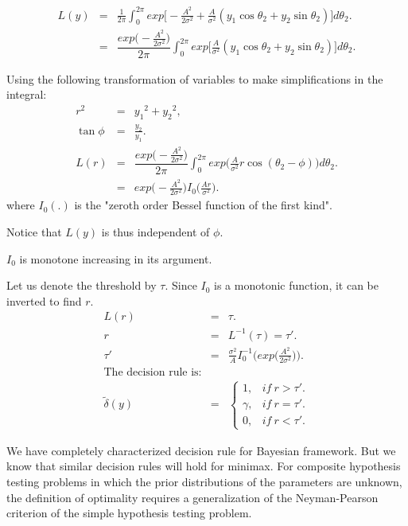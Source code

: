 \documentclass[a4paper,english,12pt]{article}
\begin{document}
\begin{exmp}
\begin{eqnarray}
L(y) &=& \frac{1}{2\pi}\int_{0}^{2\pi}exp\Big[-\frac{A^2}{2{\sigma}^2}+\frac{A}{{\sigma}^2}(y_1\cos\theta_2 + y_2\sin\theta_2)\Big]d\theta_2. \nonumber \\
&=&\dfrac{exp\big(-\frac{A^2}{2{\sigma}^2}\big)}{2\pi}\int_{0}^{2\pi}exp\Big[\frac{A}{{\sigma}^2}(y_1\cos\theta_2 + y_2\sin\theta_2)\Big]d\theta_2.
\end{eqnarray}

Using the following transformation of variables to make simplifications in the integral:
\begin{eqnarray}
r^2 &=& {y_1}^2 + {y_2}^2,\\
\tan\phi &=& \frac{y_2}{y_1}.\\
L(r) &=& \dfrac{exp\big(-\frac{A^2}{2\sigma^2}\big)}{2\pi}\int_{0}^{2\pi}exp\big(\frac{A}{\sigma^2}r\cos(\theta_2 - \phi)\big)d\theta_2.\\
&=& exp\big(-\frac{A^2}{2\sigma^2}\big)I_0\big(\frac{Ar}{\sigma^2}\big).
\end{eqnarray}
where $I_0(.)$ is the "zeroth order Bessel function of the first kind".

\begin{note} 
Notice that $L(y)$ is thus independent of $\phi$.
\end{note}
\begin{note}
$I_0$ is monotone increasing in its argument.
\end{note}

Let us denote the threshold by $\tau$. Since $I_0$ is a monotonic function, it can be inverted to find $r$.
\begin{eqnarray}
L(r) &=& \tau.\\
r &=& L^{-1}(\tau) = \tau'.\\
\tau' &=& \frac{\sigma^2}{A}I_0^{-1}\Big(exp\big(\frac{A^2}{2\sigma^2}\big)\Big).\\
\text{The decision rule is:} \nonumber\\
\tilde{\delta}(y) &=&
\begin{cases}
1, &if~ r > \tau'.\\
\gamma, &if~ r = \tau'.\\
0, &if~ r < \tau'.
\end{cases}
\end{eqnarray}
\end{exmp}

We have completely characterized decision rule for Bayesian framework. But we know that similar decision rules will hold for minimax. For composite hypothesis testing problems in which the prior distributions of the parameters are unknown, the definition of optimality requires a generalization of the Neyman-Pearson criterion of the simple hypothesis testing problem.
\end{document}
